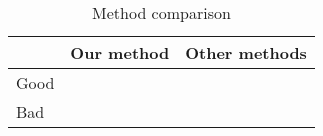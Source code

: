 \begin{table}[!htp]
	\normalsize
	\centering
	\caption{Method comparison}
	\begin{tabular}{lcc}
		\toprule
			& Our method & Other methods\\
		\midrule
		Good & \checkmark & \xmark \\
		Bad  & \xmark     & \checkmark
		\bottomrule
		\label{tab:comparison}
	\end{tabular}
\end{table}
